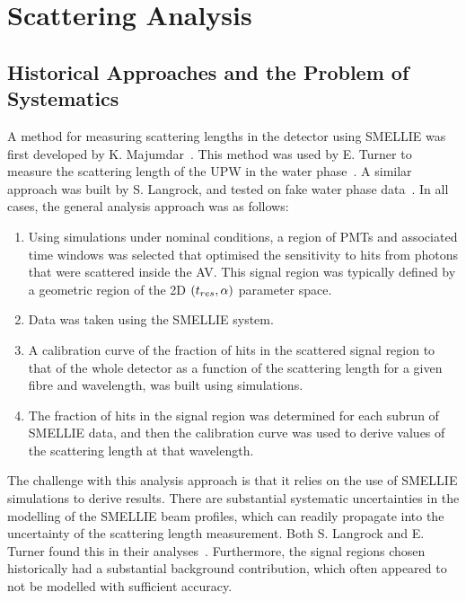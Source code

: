 \section{Scattering Analysis}\label{sec:scattering_analysis}
\subsection{Historical Approaches and the Problem of Systematics}
A method for measuring scattering lengths in the detector using SMELLIE was first developed by K. Majumdar~\cite{majumdarMeasurementOpticalScattering2015}. This method was used by E. Turner to measure the scattering length of the UPW in the water phase~\cite{turnerMeasurementScatteringCharacteristics2022}. A similar approach was built by S. Langrock, and tested on fake water phase data~\cite{langrockMeasurementRayleighScattering2016}. In all cases, the general analysis approach was as follows:
\begin{enumerate}
    \item Using simulations under nominal conditions, a region of PMTs and associated time windows was selected that optimised the sensitivity to hits from photons that were scattered inside the AV. This signal region was typically defined by a geometric region of the 2D $(t_{res}{},\alpha)$ parameter space.
    \item Data was taken using the SMELLIE system.
    \item A calibration curve of the fraction of hits in the scattered signal region to that of the whole detector as a function of the scattering length for a given fibre and wavelength, was built using simulations.
    \item The fraction of hits in the signal region was determined for each subrun of SMELLIE data, and then the calibration curve was used to derive values of the scattering length at that wavelength.
\end{enumerate}

The challenge with this analysis approach is that it relies on the use of SMELLIE simulations to derive results. There are substantial systematic uncertainties in the modelling of the SMELLIE beam profiles, which can readily propagate into the uncertainty of the scattering length measurement. Both S. Langrock and E. Turner found this in their analyses~\cite{langrockMeasurementRayleighScattering2016,turnerMeasurementScatteringCharacteristics2022}. Furthermore, the signal regions chosen historically had a substantial background contribution, which often appeared to not be modelled with sufficient accuracy.

